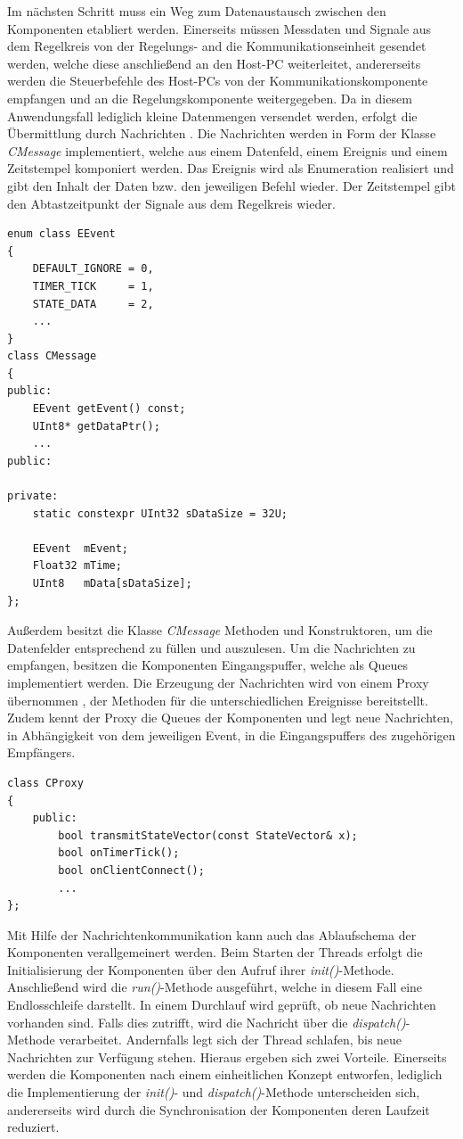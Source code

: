 Im nächsten Schritt muss ein Weg zum Datenaustausch zwischen den Komponenten etabliert werden. Einerseits müssen Messdaten und Signale aus dem Regelkreis von der Regelungs- and die Kommunikationseinheit gesendet werden, welche diese anschließend an den Host-PC weiterleitet, andererseits werden die Steuerbefehle des Host-PCs von der Kommunikationskomponente empfangen und an die Regelungskomponente weitergegeben. Da in diesem Anwendungsfall lediglich kleine Datenmengen versendet werden, erfolgt die Übermittlung durch Nachrichten \cite[S. 196]{Wietzke1}. Die Nachrichten werden in Form der Klasse \textit{CMessage} implementiert, welche aus einem Datenfeld, einem Ereignis und einem Zeitstempel komponiert werden. Das Ereignis wird als Enumeration realisiert und gibt den Inhalt der Daten bzw. den jeweiligen Befehl wieder. Der Zeitstempel gibt den Abtastzeitpunkt der Signale aus dem Regelkreis wieder. 
\begin{lstlisting}[caption={Beispielhafte Implementierung der Events und Nachrichten},captionpos=b]
enum class EEvent
{
	DEFAULT_IGNORE = 0,
	TIMER_TICK     = 1,
	STATE_DATA     = 2,
	...
}
class CMessage
{
public:
	EEvent getEvent() const;
	UInt8* getDataPtr();
	...
public:

private:
	static constexpr UInt32 sDataSize = 32U;

	EEvent  mEvent;
	Float32 mTime;	
	UInt8   mData[sDataSize];
};
\end{lstlisting}
Außerdem besitzt die Klasse \textit{CMessage} Methoden und Konstruktoren, um die Datenfelder entsprechend zu füllen und auszulesen. Um die Nachrichten zu empfangen, besitzen die Komponenten Eingangspuffer, welche als Queues implementiert werden. Die Erzeugung der Nachrichten wird von einem Proxy übernommen \cite[S. 285 ff.]{Wietzke1}, der Methoden für die unterschiedlichen Ereignisse bereitstellt. Zudem kennt der Proxy die Queues der Komponenten und legt neue Nachrichten, in Abhängigkeit von dem jeweiligen Event, in die Eingangspuffers des zugehörigen Empfängers.
\begin{lstlisting}[caption={Aufbau der Proxy-Klasse},captionpos=b]
class CProxy
{
	public:
		bool transmitStateVector(const StateVector& x);
		bool onTimerTick();
		bool onClientConnect();
		...
};
\end{lstlisting}
Mit Hilfe der Nachrichtenkommunikation kann auch das Ablaufschema der Komponenten verallgemeinert werden. Beim Starten der Threads erfolgt die Initialisierung der Komponenten über den Aufruf ihrer \textit{init()}-Methode. Anschließend wird die \textit{run()}-Methode ausgeführt, welche in diesem Fall eine Endlosschleife darstellt. In einem Durchlauf wird geprüft, ob neue Nachrichten vorhanden sind. Falls dies zutrifft, wird die Nachricht über die \textit{dispatch()}-Methode verarbeitet. Andernfalls legt sich der Thread schlafen, bis neue Nachrichten zur Verfügung stehen. Hieraus ergeben sich zwei Vorteile. Einerseits werden die Komponenten nach einem einheitlichen Konzept entworfen, lediglich die Implementierung der \textit{init()}- und \textit{dispatch()}-Methode unterscheiden sich, andererseits wird durch die Synchronisation der Komponenten deren Laufzeit reduziert.